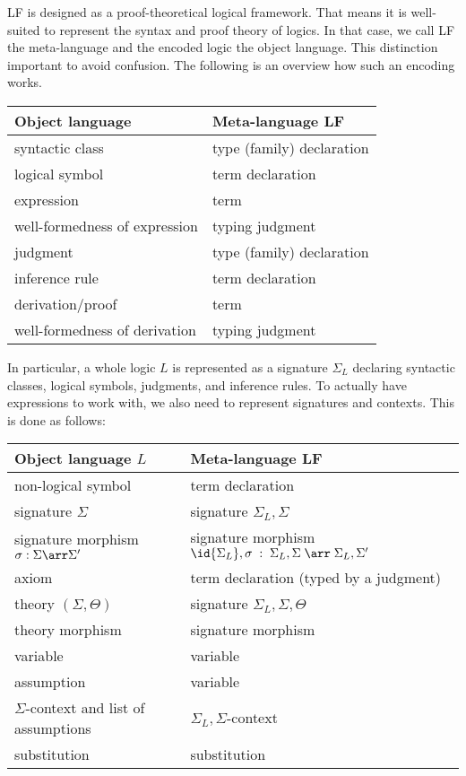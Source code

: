 LF is designed as a proof-theoretical logical framework. That means it is well-suited to represent the syntax and proof theory of logics. In that case, we call LF the meta-language and the encoded logic the object language. This distinction important to avoid confusion. The following is an overview how such an encoding works.

\begin{center}
\begin{tabular}{|l|l|}
\hline
Object language & Meta-language LF \\
\hline
syntactic class & type (family) declaration \\
logical symbol  & term declaration \\
expression      & term \\
well-formedness of expression & typing judgment \\
\hline
judgment        & type (family) declaration \\
inference rule  & term declaration \\
derivation/proof& term \\
well-formedness of derivation & typing judgment \\
\hline
\end{tabular}
\end{center}

In particular, a whole logic $L$ is represented as a signature $\Sigma_L$ declaring syntactic classes, logical symbols, judgments, and inference rules. To actually have expressions to work with, we also need to represent signatures and contexts. This is done as follows:

\begin{center}
\begin{tabular}{|l|l|}
\hline
Object language $L$ & Meta-language LF \\
\hline
non-logical symbol  & term declaration \\
signature $\Sigma$  & signature $\Sigma_L,\Sigma$ \\
signature morphism $\sigma:\Sigma\arr\Sigma'$
  & signature morphism $\id{\Sigma_L},\sigma\;:\;\Sigma_L,\Sigma\;\arr\;\Sigma_L,\Sigma'$ \\
\hline
axiom                    & term declaration (typed by a judgment) \\
theory $(\Sigma,\Theta)$ & signature $\Sigma_L,\Sigma,\Theta$ \\
theory morphism          & signature morphism \\
\hline
variable        & variable \\
assumption      & variable \\
$\Sigma$-context and list of assumptions & $\Sigma_L,\Sigma$-context \\
substitution     & substitution \\
\hline
\end{tabular}
\end{center}


